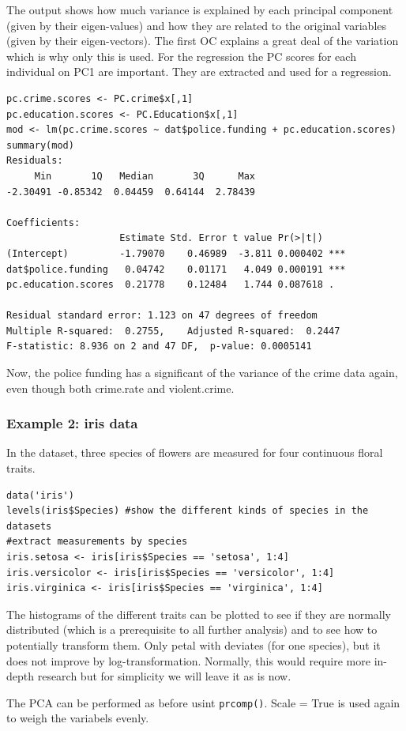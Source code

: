 \documentclass{article}
\begin{document}
The output shows how much variance is explained by each principal component (given by their eigen-values) and how they are related to the original variables (given by their eigen-vectors). The first OC explains a great deal of the variation which is why only this is used. For the regression the PC scores for each individual on PC1 are important. They are extracted and used for a regression.

\begin{lstlisting}
pc.crime.scores <- PC.crime$x[,1]
pc.education.scores <- PC.Education$x[,1]
mod <- lm(pc.crime.scores ~ dat$police.funding + pc.education.scores)
summary(mod)
Residuals:
     Min       1Q   Median       3Q      Max 
-2.30491 -0.85342  0.04459  0.64144  2.78439 

Coefficients:
                    Estimate Std. Error t value Pr(>|t|)    
(Intercept)         -1.79070    0.46989  -3.811 0.000402 ***
dat$police.funding   0.04742    0.01171   4.049 0.000191 ***
pc.education.scores  0.21778    0.12484   1.744 0.087618 .  

Residual standard error: 1.123 on 47 degrees of freedom
Multiple R-squared:  0.2755,	Adjusted R-squared:  0.2447 
F-statistic: 8.936 on 2 and 47 DF,  p-value: 0.0005141
\end{lstlisting}

Now, the police funding has a significant of the variance of the crime data again, even though both crime.rate and violent.crime.

\subsubsection{Example 2: iris data}
In the dataset, three species of flowers are measured for four continuous floral traits.

\begin{lstlisting}
data('iris')
levels(iris$Species) #show the different kinds of species in the datasets
#extract measurements by species
iris.setosa <- iris[iris$Species == 'setosa', 1:4]
iris.versicolor <- iris[iris$Species == 'versicolor', 1:4]
iris.virginica <- iris[iris$Species == 'virginica', 1:4]
\end{lstlisting}
The histograms of the different traits can be plotted to see if they are normally distributed (which is a prerequisite to all further analysis) and to see how to potentially transform them. Only petal with deviates (for one species), but it does not improve by log-transformation. Normally, this would require more in-depth research but for simplicity we will leave it as is now.\par 
The PCA can be performed as before usint \texttt{prcomp()}. Scale = True is used again to weigh the variabels evenly.
\end{document}
